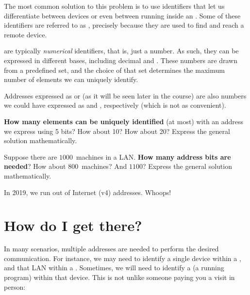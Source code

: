 The most common solution to this problem is to use identifiers that let
us differentiate between devices or even between running 
inside an . Some of these identifiers are
referred to as , precisely because they are used 
to find and reach a remote device. 


 are typically \textit{numerical} identifiers, that is, just a number.
As such, they can be expressed in different bases, including decimal and .
These numbers are drawn from a predefined set, and the choice of that set
determines the maximum number of elements we can uniquely identify.

\begin{remark}
Addresses expressed as  or  
(as it will be seen later in the course) are also numbers we could have expressed 
as  and , respectively
(which is not as convenient).
\end{remark}

\begin{exercise}
\textbf{How many elements can be uniquely identified} (at most) with an address we express 
using 5 bits? How about 10? How about 20? Express the general solution mathematically.
\end{exercise}

\begin{exercise}
Suppose there are $1000$~machines in a LAN. \textbf{How many address bits are needed}?
How about $800$~machines? And $1100$? Express the general solution mathematically.
\end{exercise} 

\begin{remark}
In 2019, we run out of Internet (v4) addresses. Whoops!
\end{remark}

\section{How do I get there?}

In many scenarios, multiple addresses are needed to perform the desired 
 communication. For instance, we may need to identify
a single device within a , and that LAN within a . Sometimes, we will need 
to identify a  (a running program) within that device. 
This is not unlike someone paying you a visit in person:

